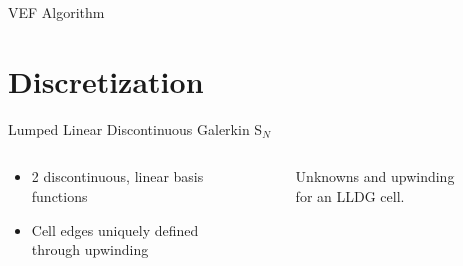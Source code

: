 \documentclass[10pt]{beamer}
\newcommand{\SN}{S$_N$\xspace}
\begin{document}
\begin{frame}{VEF Algorithm}

	\begin{figure}

		\only<2>{\def\svgwidth{.8\textwidth}}

	\end{figure}

\end{frame}

\section{Discretization}

\begin{frame}{Lumped Linear Discontinuous Galerkin \SN}

	\begin{columns}

		\begin{column}{.5\textwidth}
		\begin{itemize}

			\item 
			2 discontinuous, linear basis functions 

			\item 
			Cell edges uniquely defined through upwinding 


		\end{itemize}
		\end{column}
		\begin{column}{.5\textwidth}

			\begin{figure}

				\def\svgwidth{\textwidth}
				
				\caption{Unknowns and upwinding for an LLDG cell. }
				
			\end{figure}

		\end{column}

	\end{columns} 

	\vspace{-.2in}
	\begin{columns}
	\begin{column}{1.06\textwidth}
	\begin{itemize}


\end{itemize}
\end{column}
\end{columns}
\end{frame}
\end{document}
